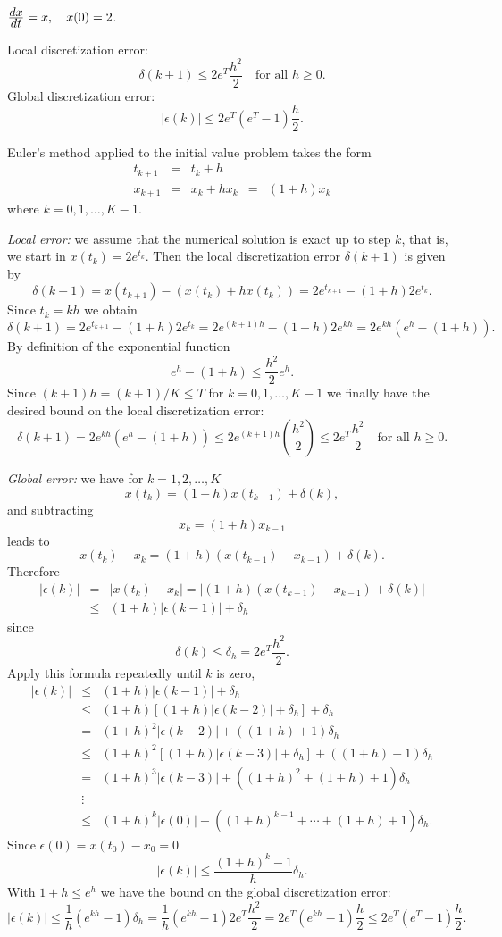 \documentclass{ximera}
\begin{document}
\begin{exercise} \label{c15.2.1b}
$\frac{\displaystyle dx}{\displaystyle dt} = x,\quad x(0)=2$.

\begin{solution}
\ans Local discretization error:
\[
\delta(k+1) \le
2e^{T}\frac{h^2}{2} \quad \mbox{for all $h\ge 0$.}
\]
Global discretization error:
\[
|\epsilon(k)| \le 2e^{T}(e^{T}-1)\frac{h}{2}.
\]

\soln Euler's method applied to the initial value problem takes the form
\[
\begin{array}{rclcl}
t_{k+1} & = & t_k+h & & \\
x_{k+1} & = & x_k + h x_k & = & (1+h)x_k
\end{array}
\]
where $k=0,1,\ldots,K-1$.

{\em Local error:} we assume that the
numerical solution is exact up to step $k$, that is,
we start in $x(t_k)=2e^{t_k}$.  Then the local discretization error
$\delta(k+1)$ is given by
\[
\delta(k+1) = x(t_{k+1}) - (x(t_k) + h x(t_k))=
2e^{t_{k+1}} - (1+h)2e^{t_k}.
\]
Since $t_k = kh$ we obtain
\[
\delta(k+1) = 2e^{t_{k+1}} - (1+h)2e^{t_k} =
2e^{(k+1)h} - (1+h)2e^{kh} = 2e^{kh}(e^{h}-(1+h)).
\]
By definition of the exponential function
\[
e^{h}-(1+h) \le \frac{h^2}{2}e^{h}.
\]
Since $(k+1)h=(k+1)/K\le T$ for $k=0,1,\ldots,K-1$ we finally have the
desired bound on the local discretization error:
\[
\delta(k+1) = 2e^{kh}(e^{h}-(1+h)) \le
2e^{(k+1)h}\left(\frac{h^2}{2}\right)\le
2e^{T}\frac{h^2}{2} \quad \mbox{for all $h\ge 0$.}
\]

{\em Global error:} we have for $k=1,2,\ldots,K$
\[
x(t_k)=(1+h)x(t_{k-1})+\delta(k),
\]
and subtracting
\[
x_k = (1+h)x_{k-1}
\]
leads to
\[
x(t_k) - x_k = (1+h)(x(t_{k-1})-x_{k-1})+\delta(k).
\]
Therefore
\begin{eqnarray*}
|\epsilon(k)| & = & |x(t_k) - x_k| =
|(1+h)(x(t_{k-1})-x_{k-1})+\delta(k)|\\
& \le & (1+h)|\epsilon(k-1)|+\delta_h
\end{eqnarray*}
since
\[
\delta(k)\le \delta_h = 2e^{T}\frac{h^2}{2}.
\]
Apply this formula repeatedly until $k$ is zero,
\[
\begin{array}{rcl}
|\epsilon(k)|&\le&(1+h)|\epsilon(k-1)|+\delta_h\\
&\le& (1+h)[(1+h)|\epsilon(k-2)|+\delta_h]+\delta_h\\
&=& (1+h)^2|\epsilon(k-2)| + ((1+h) + 1)\delta_h\\
&\le& (1+h)^2[(1+h)|\epsilon(k-3)|+\delta_h] + ((1+h) + 1)\delta_h\\
&=& (1+h)^3|\epsilon(k-3)| + ((1+h)^2 + (1+h) + 1)\delta_h\\
&\vdots& \\
&\le & (1+h)^k|\epsilon(0)| + ((1+h)^{k-1} +\cdots + (1+h) + 1)\delta_h.
\end{array}
\]
Since $\epsilon(0)=x(t_0) - x_0=0$
\[
|\epsilon(k)| \le \frac{(1+h)^k -1}{h}\delta_h.
\]
With $1+h\le e^{h}$ we have the bound on the global discretization error:
\[
|\epsilon(k)| \le \frac{1}{h} (e^{kh}-1)\delta_h=
\frac{1}{h}(e^{kh}-1)2e^{T}\frac{h^2}{2} =
2e^{T}(e^{kh}-1)\frac{h}{2}
\le 2e^{T}(e^{T}-1)\frac{h}{2}.
\]


\end{solution}
\end{exercise}
\end{document}
